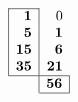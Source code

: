\documentclass[10pt]{article}
\begin{document}
\TeXtoEPS
\setlength\arraycolsep{1pt}
\(
\begin{array}{|r|r}
\cline{1-1}
 \textbf{1} & 0\\
 \textbf{5} & \textbf{1}\\
\textbf{15} & \textbf{6}\\
\textbf{35} & \textbf{21}\\
\hline
\multicolumn{1}{r|}{} & \multicolumn{1}{r|}{\textbf{56}}\\
\cline{2-2}
\end{array}
\)
\endTeXtoEPS
\end{document}
